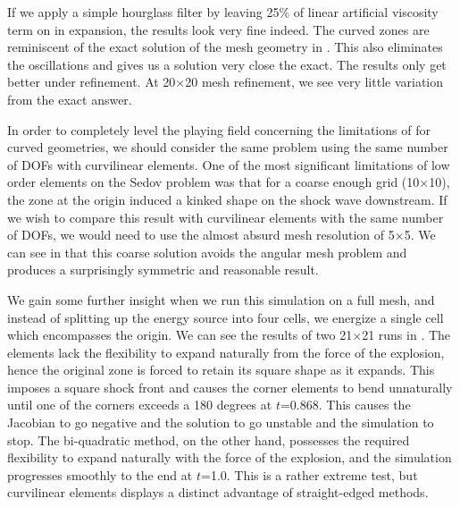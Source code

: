 If we apply a simple hourglass filter by leaving 25\% of linear artificial viscosity term on in expansion, the results look very fine indeed. The curved zones are reminiscent of the exact solution of the mesh geometry in . This also eliminates the oscillations and gives us a solution very close the exact. The results only get better under refinement. At 20$\times$20 mesh refinement, we see very little variation from the exact answer.

In order to completely level the playing field concerning the limitations of  for curved geometries, we should consider the same problem using the same number of DOFs with curvilinear elements. One of the most significant limitations of low order elements on the Sedov problem was that for a coarse enough grid (10$\times$10), the zone at the origin induced a kinked shape on the shock wave downstream. If we wish to compare this result with curvilinear elements with the same number of DOFs, we would need to use the almost absurd mesh resolution of 5$\times$5. We can see in  that this coarse  solution avoids the angular mesh problem and produces a surprisingly symmetric and reasonable result.



We gain some further insight when we run this simulation on a full mesh, and instead of splitting up the energy source into four cells, we energize a single cell which encompasses the origin. We can see the results of two 21$\times$21 runs in . The  elements lack the flexibility to expand naturally from the force of the explosion, hence the original zone is forced to retain its square shape as it expands. This imposes a square shock front and causes the corner elements to bend unnaturally until one of the corners exceeds a 180 degrees at $t$=0.868. This causes the Jacobian to go negative and the solution to go unstable and the simulation to stop. The bi-quadratic method, on the other hand, possesses the required flexibility to expand naturally with the force of the explosion, and the simulation progresses smoothly to the end at $t$=1.0. This is a rather extreme test, but curvilinear elements displays a distinct advantage of straight-edged methods. 

